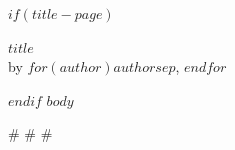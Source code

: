 \documentclass[12pt,$papersize$,oneside]{book}
\begin{document}
$if(title-page)$
\thispagestyle{empty}
\vspace*{3in}
\begin{center}\MakeUppercase{$title$}\\[1em] by $for(author)$$author$$sep$, $endfor$\end{center}
\clearpage
$endif$
$body$
\begin{center}\# \# \#\end{center}
\end{document}
